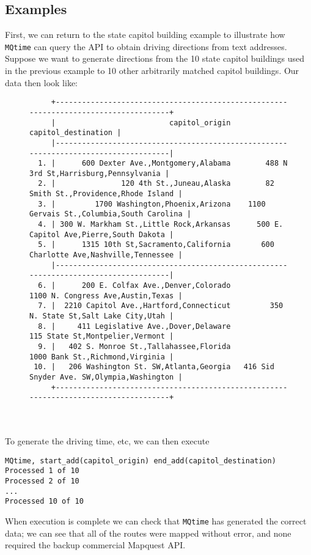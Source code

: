 \documentclass[12pt]{article}
\begin{document}
\subsection{Examples}
First, we can return to the state capitol building example to illustrate how \verb|MQtime| can query the API to obtain driving directions from text addresses. Suppose we want to generate directions from the 10 state capitol buildings used in the previous example to 10 other arbitrarily matched capitol buildings. Our data then look like:
\begin{figure}[ht]
{\footnotesize
\begin{verbatim}
     +-------------------------------------------------------------------------------------+
     |                          capitol_origin                         capitol_destination |
     |-------------------------------------------------------------------------------------|
  1. |      600 Dexter Ave.,Montgomery,Alabama        488 N 3rd St,Harrisburg,Pennsylvania |
  2. |               120 4th St.,Juneau,Alaska        82 Smith St.,Providence,Rhode Island |
  3. |         1700 Washington,Phoenix,Arizona    1100 Gervais St.,Columbia,South Carolina |
  4. | 300 W. Markham St.,Little Rock,Arkansas      500 E. Capitol Ave,Pierre,South Dakota |
  5. |      1315 10th St,Sacramento,California       600 Charlotte Ave,Nashville,Tennessee |
     |-------------------------------------------------------------------------------------|
  6. |      200 E. Colfax Ave.,Denver,Colorado           1100 N. Congress Ave,Austin,Texas |
  7. |  2210 Capitol Ave.,Hartford,Connecticut         350 N. State St,Salt Lake City,Utah |
  8. |     411 Legislative Ave.,Dover,Delaware             115 State St,Montpelier,Vermont |
  9. |   402 S. Monroe St.,Tallahassee,Florida             1000 Bank St.,Richmond,Virginia |
 10. |   206 Washington St. SW,Atlanta,Georgia   416 Sid Snyder Ave. SW,Olympia,Washington |
     +-------------------------------------------------------------------------------------+
\end{verbatim}
}
\end{figure}
\\ \\
To generate the driving time, etc, we can then execute
\begin{center}
\begin{verbatim}
MQtime, start_add(capitol_origin) end_add(capitol_destination)
Processed 1 of 10
Processed 2 of 10
...
Processed 10 of 10
\end{verbatim}
\end{center}
When execution is complete we can check that \verb|MQtime| has generated the correct data; we can see that all of the routes were mapped without error, and none required the backup commercial Mapquest API.
\end{document}
